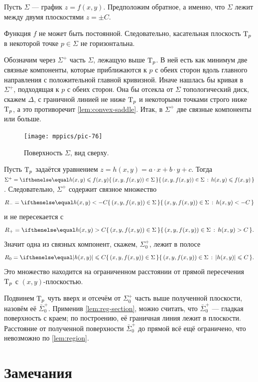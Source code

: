 
Пусть $\Sigma$ --- график $z=f(x,y)$.
Предположим обратное, а именно, что $\Sigma$ лежит между двумя плоскостями $z=\pm C$. 

Функция $f$ не может быть постоянной.
Следовательно, касательная плоскость $\mathrm{T}_p$ в некоторой точке $p\in\Sigma$ не горизонтальна.

Обозначим через $\Sigma^+$ часть $\Sigma$, лежащую выше $\mathrm{T}_p$.
В ней есть как минимум две связные компоненты, которые приближаются к $p$ с обеих сторон 
вдоль главного направления с положительной главной кривизной.
Иначе нашлась бы кривая в $\Sigma^+$, подходящая к $p$ с обеих сторон.
Она бы отсекла от $\Sigma$ топологический диск, скажем $\Delta$, с граничной линией не ниже $\mathrm{T}_p$ и некоторыми точками строго ниже $\mathrm{T}_p$,
а это противоречит \ref{lem:convex-saddle}. 
Итак, в $\Sigma^+$ две связные компоненты или больше.

\begin{figure}[!ht]
\vskip-1mm
\centering
\texttt{[image: mppics/pic-76]}
\caption*{Поверхность $\Sigma$, вид сверху.}
\vskip0mm
\end{figure}

Пусть $\mathrm{T}_p$ задаётся уравнением $z=h(x,y)=a\cdot x+b\cdot y+c$.
Тогда $\Sigma^{+} = \set{(x,y,f(x,y))\in \Sigma}{h(x,y) \leq f(x,y)}$.
Следовательно, $\Sigma^{+}$ содержит связное множество
\[R_-=\set{(x,y,f(x,y))\in\Sigma}{h(x,y)< -C}\] 
и не пересекается с  
\[R_+=\set{(x,y,f(x,y))\in\Sigma}{h(x,y)> C} . \]
Значит одна из связных компонент, скажем, $\Sigma^+_0$, лежит в полосе
\[R_0=\set{(x,y,f(x,y))\in\Sigma}{|h(x,y)|\le  C}.\]
Это множество находится на ограниченном расстоянии от прямой пересечения $\mathrm{T}_p$ с $(x,y)$-плоскостью.

Подвинем $\mathrm{T}_p$ чуть вверх и отсечём от $\Sigma^+_0$ часть выше полученной плоскости, назовём её $\bar\Sigma^+_0$.
Применив \ref{lem:reg-section},
можно считать, что $\bar\Sigma^+_0$ --- гладкая поверхность с краем;
по построению, её граничная линия лежит в плоскости.
Расстояние от полученной поверхности $\bar\Sigma^+_0$ до прямой всё ещё ограничено,
что невозможно по \ref{lem:region}.
\qeds


\section{Замечания}


